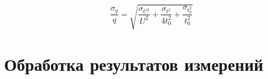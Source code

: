 \documentclass[a4paper,12pt]{article} %
\begin{document}
\begin{equation}
    \frac{\sigma_{q}}{q} = \sqrt{\frac{\sigma_{U^{2}}}{U^{2}} + \frac{\sigma_{t^{2}}}{4t_{0}^{2}} + \frac{\sigma_{t_{0}^{2}}}{t_{0}^{2}}}
\end{equation}

\newpage
\section{Обработка результатов измерений}
\\
\end{document}
